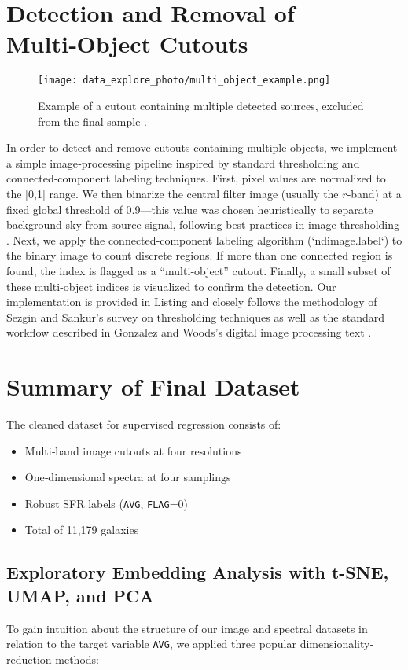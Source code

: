 \documentclass[english,bachelor,oneside]{ctufit-thesis}
\begin{document}
\section{Detection and Removal of Multi‑Object Cutouts}
\begin{figure}[H]
    \centering
    \texttt{[image: data\_explore\_photo/multi\_object\_example.png]}
    \caption{Example of a cutout containing multiple detected sources, excluded from the final sample \cite{data_exploring} .}
    \label{fig:multi_object_example}
\end{figure}
\noindent In order to detect and remove cutouts containing multiple objects, we implement a simple image‐processing pipeline inspired by standard thresholding and connected‐component labeling techniques. First, pixel values are normalized to the [0,1] range. We then binarize the central filter image (usually the $r$‐band) at a fixed global threshold of 0.9—this value was chosen heuristically to separate background sky from source signal, following best practices in image thresholding \cite{sezgin2004survey}. Next, we apply the connected‐component labeling algorithm (`ndimage.label`) to the binary image to count discrete regions. If more than one connected region is found, the index is flagged as a “multi‐object” cutout. Finally, a small subset of these multi‐object indices is visualized to confirm the detection. Our implementation is provided in Listing \cite{data_exploring} and closely follows the methodology of Sezgin and Sankur’s survey on thresholding techniques \cite{sezgin2004survey} as well as the standard workflow described in Gonzalez and Woods’s digital image processing text \cite{GonzalezWoods2008}.


\section{Summary of Final Dataset}
The cleaned dataset for supervised regression consists of:
\begin{itemize}
  \item Multi‑band image cutouts at four resolutions
  \item One‑dimensional spectra at four samplings
  \item Robust SFR labels (\texttt{AVG}, \texttt{FLAG}=0)
  \item Total of 11,179 galaxies
\end{itemize}

\subsection{Exploratory Embedding Analysis with t-SNE, UMAP, and PCA}
To gain intuition about the structure of our image and spectral datasets in relation to the target variable \texttt{AVG}, we applied three popular dimensionality‐reduction methods:
\end{document}
